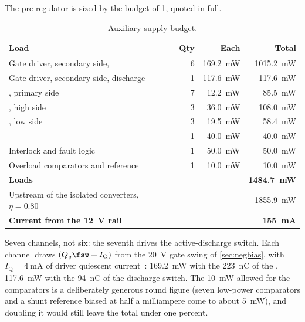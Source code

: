 The pre-regulator is sized by the budget of \cref{tab:auxbudget}, quoted in
full.

\begin{table}[htbp]
\centering
\caption{Auxiliary supply budget.}
\label{tab:auxbudget}
\begin{tabular}{lrrr}
\toprule
Load & Qty & Each & Total \\
\midrule
Gate driver, secondary side, \device{} & 6 & \SI{169.2}{\milli\watt} & \SI{1015.2}{\milli\watt} \\
Gate driver, secondary side, discharge  & 1 & \SI{117.6}{\milli\watt} & \SI{117.6}{\milli\watt} \\
\driver{}, primary side              & 7 & \SI{12.2}{\milli\watt}  & \SI{85.5}{\milli\watt} \\
\isoamp{}, high side                 & 3 & \SI{36.0}{\milli\watt}  & \SI{108.0}{\milli\watt} \\
\isoamp{}, low side                  & 3 & \SI{19.5}{\milli\watt}  & \SI{58.4}{\milli\watt} \\
\isoampv{}                           & 1 & \SI{40.0}{\milli\watt}  & \SI{40.0}{\milli\watt} \\
Interlock and fault logic            & 1 & \SI{50.0}{\milli\watt}  & \SI{50.0}{\milli\watt} \\
Overload comparators and reference   & 1 & \SI{10.0}{\milli\watt}  & \SI{10.0}{\milli\watt} \\
\midrule
\textbf{Loads}                       &   &   & \textbf{\SI{1484.7}{\milli\watt}} \\
Upstream of the isolated converters, $\eta = \num{0.80}$~\cite{murata_mgj2}
                                     &   &   & \SI{1855.9}{\milli\watt} \\
\textbf{Current from the \SI{12}{\volt} rail} & & & \textbf{\SI{155}{\milli\ampere}} \\
\bottomrule
\end{tabular}
\end{table}

Seven channels, not six: the seventh drives the active-discharge switch.
Each channel draws $(Q_g\fsw + I_\mathrm{Q})$ from the \SI{20}{\volt} gate
swing of \cref{sec:negbias}, with $I_\mathrm{Q} = \SI{4}{\milli\ampere}$ of
driver quiescent current~\cite{ti_ucc21750}: \SI{169.2}{\milli\watt} with
the \SI{223}{\nano\coulomb} of the \device{}, \SI{117.6}{\milli\watt} with
the \SI{94}{\nano\coulomb} of the discharge switch. The \SI{10}{\milli\watt}
allowed for the comparators is a deliberately generous round figure (seven
low-power comparators and a shunt reference biased at half a milliampere
come to about \SI{5}{\milli\watt}), and doubling it would still leave the
total under one percent.

